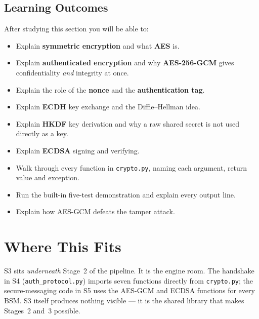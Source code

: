 \documentclass[11pt,a4paper]{report}
\begin{document}
\subsection*{Learning Outcomes}
After studying this section you will be able to:
\begin{itemize}
  \item Explain \textbf{symmetric encryption} and what \textbf{AES} is.
  \item Explain \textbf{authenticated encryption} and why \textbf{AES-256-GCM}
        gives confidentiality \emph{and} integrity at once.
  \item Explain the role of the \textbf{nonce} and the \textbf{authentication
        tag}.
  \item Explain \textbf{ECDH} key exchange and the Diffie--Hellman idea.
  \item Explain \textbf{HKDF} key derivation and why a raw shared secret is not
        used directly as a key.
  \item Explain \textbf{ECDSA} signing and verifying.
  \item Walk through every function in \texttt{crypto.py}, naming each argument,
        return value and exception.
  \item Run the built-in five-test demonstration and explain every output line.
  \item Explain how AES-GCM defeats the tamper attack.
\end{itemize}

\section{Where This Fits}

S3 sits \emph{underneath} Stage~2 of the pipeline. It is the engine room. The
handshake in S4 (\texttt{auth\_protocol.py}) imports seven functions directly
from \texttt{crypto.py}; the secure-messaging code in S5 uses the AES-GCM and
ECDSA functions for every BSM. S3 itself produces nothing visible --- it is the
shared library that makes Stages~2 and~3 possible.
\end{document}
